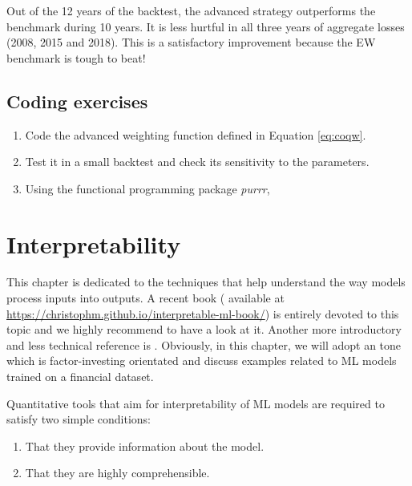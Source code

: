 \documentclass[]{krantz}
\providecommand{\tightlist}{%
  \setlength{\itemsep}{0pt}\setlength{\parskip}{0pt}}
\theoremstyle{definition}
\theoremstyle{definition}
\theoremstyle{definition}
\theoremstyle{remark}
\begin{document}
\normalsize

Out of the 12 years of the backtest, the advanced strategy outperforms
the benchmark during 10 years. It is less hurtful in all three years of
aggregate losses (2008, 2015 and 2018). This is a satisfactory
improvement because the EW benchmark is tough to beat!

\hypertarget{coding-exercises-6}{%
\section{Coding exercises}\label{coding-exercises-6}}

\begin{enumerate}
\def\labelenumi{\arabic{enumi}.}
\tightlist
\item
  Code the advanced weighting function defined in Equation
  \eqref{eq:coqw}.
\item
  Test it in a small backtest and check its sensitivity to the
  parameters.
\item
  Using the functional programming package \emph{purrr},
\end{enumerate}

\hypertarget{interp}{%
\chapter{Interpretability}\label{interp}}

This chapter is dedicated to the techniques that help understand the way
models process inputs into outputs. A recent book
(\citet{molnar2019interpretable} available at
\url{https://christophm.github.io/interpretable-ml-book/}) is entirely
devoted to this topic and we highly recommend to have a look at it.
Another more introductory and less technical reference is
\citet{hall2019introduction}. Obviously, in this chapter, we will adopt
an tone which is factor-investing orientated and discuss examples
related to ML models trained on a financial dataset.

Quantitative tools that aim for interpretability of ML models are
required to satisfy two simple conditions:

\begin{enumerate}
\def\labelenumi{\arabic{enumi}.}
\tightlist
\item
  That they provide information about the model.\\
\item
  That they are highly comprehensible.
\end{enumerate}
\end{document}
